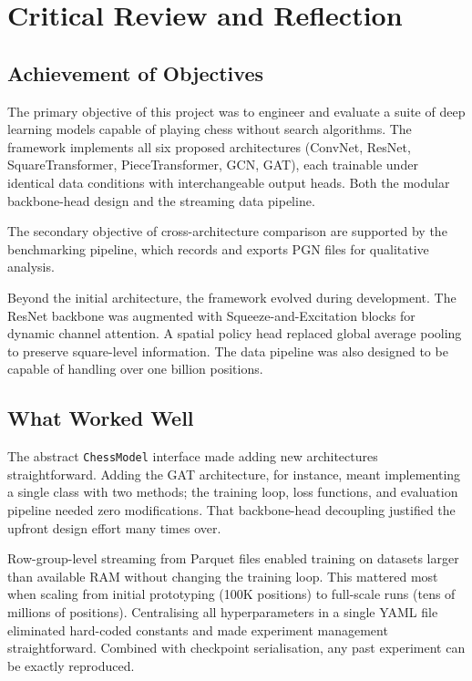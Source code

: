 \chapter{Critical Review and Reflection}

\section{Achievement of Objectives}

The primary objective of this project was to engineer and evaluate a suite of deep learning models capable of playing chess without search algorithms. The framework implements all six proposed architectures (ConvNet, ResNet, SquareTransformer, PieceTransformer, GCN, GAT), each trainable under identical data conditions with interchangeable output heads. Both the modular backbone-head design and the streaming data pipeline.

The secondary objective of cross-architecture comparison are supported by the benchmarking pipeline, which records and exports PGN files for qualitative analysis.

Beyond the initial architecture, the framework evolved during development. The ResNet backbone was augmented with Squeeze-and-Excitation blocks for dynamic channel attention. A spatial policy head replaced global average pooling to preserve square-level information. The data pipeline was also designed to be capable of handling over one billion positions.

\section{What Worked Well}

The abstract \texttt{ChessModel} interface made adding new architectures straightforward. Adding the GAT architecture, for instance, meant implementing a single class with two methods; the training loop, loss functions, and evaluation pipeline needed zero modifications. That backbone-head decoupling justified the upfront design effort many times over.

Row-group-level streaming from Parquet files enabled training on datasets larger than available RAM without changing the training loop. This mattered most when scaling from initial prototyping (100K positions) to full-scale runs (tens of millions of positions). Centralising all hyperparameters in a single YAML file eliminated hard-coded constants and made experiment management straightforward. Combined with checkpoint serialisation, any past experiment can be exactly reproduced.

